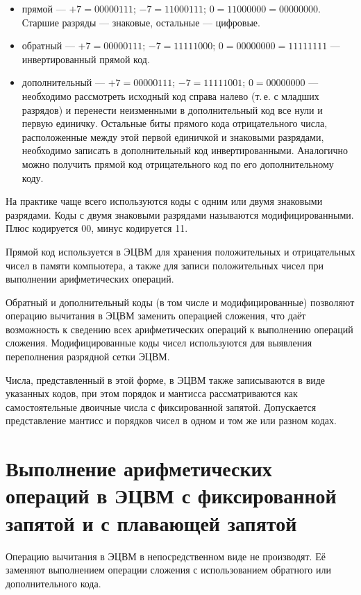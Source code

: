 \documentclass[10pt,a4paper,titlepage]{article}
\begin{document}
\begin{itemize}
\item прямой --- $+7 = 00000111$; $-7 = 11000111$; $0 = 11000000 = 00000000$. Старшие разряды --- знаковые, остальные --- цифровые.
\item обратный --- $+7 = 00000111$; $-7 = 11111000$; $0 = 00000000 = 11111111$ --- инвертированный прямой код.
\item дополнительный --- $+7 = 00000111$; $-7 = 11111001$; $0 = 00000000$ --- необходимо рассмотреть исходный код справа налево (т.\,е. с младших разрядов) и перенести неизменными в дополнительный код все нули и первую единичку.
Остальные биты прямого кода отрицательного числа, расположенные между этой первой единичкой и знаковыми разрядами, необходимо записать в дополнительный код инвертированными.
Аналогично можно получить прямой код отрицательного код по его дополнительному коду.
\end{itemize}

На практике чаще всего используются коды с одним или двумя знаковыми разрядами.
Коды с двумя знаковыми разрядами называются модифицированными.
Плюс кодируется 00, минус кодируется 11.

Прямой код используется в ЭЦВМ для хранения положительных и отрицательных чисел в памяти компьютера, а также для записи положительных чисел при выполнении арифметических операций.

Обратный и дополнительный коды (в том числе и модифицированные) позволяют операцию вычитания в ЭЦВМ заменить операцией сложения, что даёт возможность к сведению всех арифметических операций к выполнению операций сложения.
Модифицированные коды чисел используются для выявления переполнения разрядной сетки ЭЦВМ.

Числа, представленный в этой форме, в ЭЦВМ также записываются в виде указанных кодов, при этом порядок и мантисса рассматриваются как самостоятельные двоичные числа с фиксированной запятой.
Допускается представление мантисс и порядков чисел в одном и том же или разном кодах.

\newpage
\section{Выполнение арифметических операций в ЭЦВМ с фиксированной запятой и с плавающей запятой}

Операцию вычитания в ЭЦВМ в непосредственном виде не производят.
Её заменяют выполнением операции сложения с использованием обратного или дополнительного кода.
\end{document}
